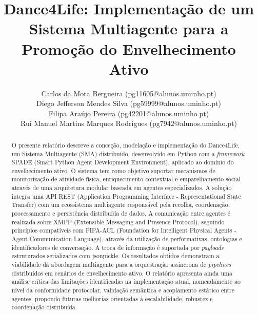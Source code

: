 \documentclass[runningheads]{llncs}
\begin{document}
%
\title{Dance4Life: Implementação de um Sistema Multiagente para a Promoção do Envelhecimento Ativo}
%
%
\author{
Carlos da Mota Bergueira (pg11605@alunos.uminho.pt) \\
Diego Jefferson Mendes Silva (pg59999@alunos.uminho.pt) \\
Filipa Araújo Pereira (pg42201@alunos.uminho.pt) \\
Rui Manuel Martins Marques Rodrigues (pg7942@alunos.uminho.pt)
}
%
%
%
\maketitle              %
%
\begin{abstract}
O presente relatório descreve a conceção, modelação e implementação do Dance4Life, um Sistema Multiagente (SMA) distribuído, desenvolvido em Python com a \textit{framework} SPADE (Smart Python Agent Development Environment), aplicado ao domínio do envelhecimento ativo. O sistema tem como objetivo suportar mecanismos de monitorização de atividade física, enriquecimento contextual e emparelhamento social através de uma arquitetura modular baseada em agentes especializados. A solução integra uma API REST (Application Programming Interface - Representational State Transfer) com um ecossistema multiagente responsável pela recolha, coordenação, processamento e persistência distribuída de dados. A comunicação entre agentes é realizada sobre XMPP (Extensible Messaging and Presence Protocol), seguindo princípios compatíveis com FIPA-ACL (Foundation for Intelligent Physical Agents - Agent Communication Language), através da utilização de performativas, ontologias e identificadores de conversação. A troca de informação é suportada por \textit{payloads} estruturados serializados com jsonpickle. Os resultados obtidos demonstram a viabilidade da abordagem multiagente para a orquestração assíncrona de \textit{pipelines} distribuídos em cenários de envelhecimento ativo. O relatório apresenta ainda uma análise crítica das limitações identificadas na implementação atual, nomeadamente ao nível da conformidade protocolar, validação semântica e acoplamento estático entre agentes, propondo futuras melhorias orientadas à escalabilidade, robustez e coordenação distribuída.


\end{abstract}
%
%
%
\end{document}
